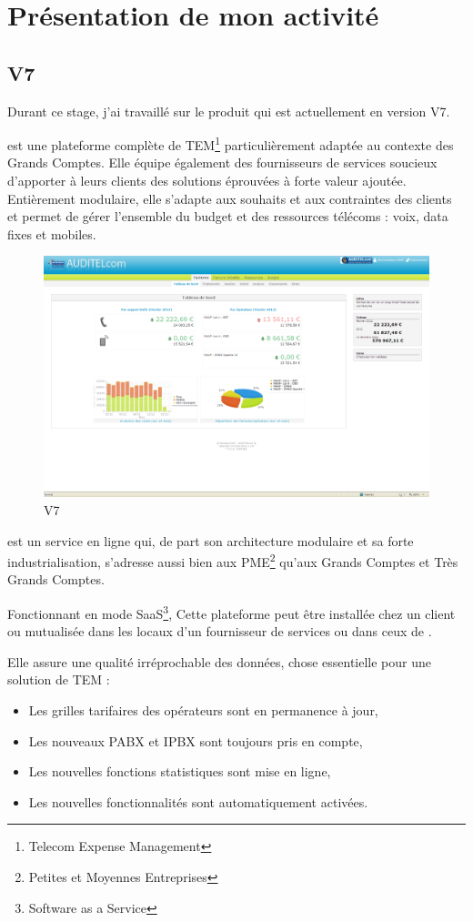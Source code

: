 \chapter{Présentation de mon activité}
	\section{\adt{} V7}	
	Durant ce stage, j'ai travaillé sur le produit \adt{} qui est actuellement en version V7.

	\adt{} est une plateforme complète de TEM\footnote{Telecom Expense Management} particulièrement adaptée au contexte des Grands Comptes.  Elle équipe également des fournisseurs de services soucieux d’apporter à leurs clients des solutions éprouvées à forte valeur ajoutée.  Entièrement modulaire, elle s’adapte aux souhaits et aux contraintes des clients et permet de gérer l’ensemble du budget et des ressources télécoms : voix, data fixes et mobiles.

\begin{figure}[H]
	\centering
	\includegraphics[width=12cm]{images/2-activite/screenAdt.png}
	\caption{\adt{} V7}
\end{figure}
\adt{} est un service en ligne qui, de part son architecture modulaire et sa forte industrialisation, s’adresse aussi bien aux PME\footnote{Petites et Moyennes Entreprises} qu’aux Grands Comptes et Très Grands Comptes.

Fonctionnant en mode SaaS\footnote{Software as a Service}, Cette plateforme peut être installée chez un client ou mutualisée dans les locaux d’un fournisseur de services ou dans ceux de \mbx{}.

Elle assure une qualité irréprochable des données, chose essentielle pour une solution de TEM :
\begin{itemize}
\item Les grilles tarifaires des opérateurs sont en permanence à jour,
\item Les nouveaux PABX et IPBX sont toujours pris en compte,
\item Les nouvelles fonctions statistiques sont mise en ligne,
\item Les nouvelles fonctionnalités sont automatiquement activées.
\end{itemize}


